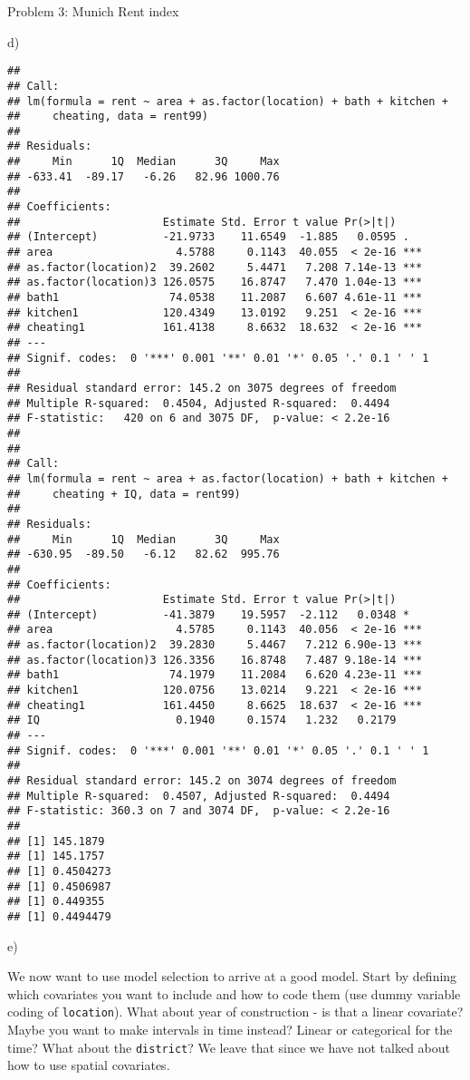 \documentclass[ignorenonframetext,]{beamer}
\begin{document}
\begin{frame}[fragile]
\begin{block}{Problem 3: Munich Rent index}
\begin{block}{d)}
\begin{verbatim}
## 
## Call:
## lm(formula = rent ~ area + as.factor(location) + bath + kitchen + 
##     cheating, data = rent99)
## 
## Residuals:
##     Min      1Q  Median      3Q     Max 
## -633.41  -89.17   -6.26   82.96 1000.76 
## 
## Coefficients:
##                      Estimate Std. Error t value Pr(>|t|)    
## (Intercept)          -21.9733    11.6549  -1.885   0.0595 .  
## area                   4.5788     0.1143  40.055  < 2e-16 ***
## as.factor(location)2  39.2602     5.4471   7.208 7.14e-13 ***
## as.factor(location)3 126.0575    16.8747   7.470 1.04e-13 ***
## bath1                 74.0538    11.2087   6.607 4.61e-11 ***
## kitchen1             120.4349    13.0192   9.251  < 2e-16 ***
## cheating1            161.4138     8.6632  18.632  < 2e-16 ***
## ---
## Signif. codes:  0 '***' 0.001 '**' 0.01 '*' 0.05 '.' 0.1 ' ' 1
## 
## Residual standard error: 145.2 on 3075 degrees of freedom
## Multiple R-squared:  0.4504, Adjusted R-squared:  0.4494 
## F-statistic:   420 on 6 and 3075 DF,  p-value: < 2.2e-16
## 
## 
## Call:
## lm(formula = rent ~ area + as.factor(location) + bath + kitchen + 
##     cheating + IQ, data = rent99)
## 
## Residuals:
##     Min      1Q  Median      3Q     Max 
## -630.95  -89.50   -6.12   82.62  995.76 
## 
## Coefficients:
##                      Estimate Std. Error t value Pr(>|t|)    
## (Intercept)          -41.3879    19.5957  -2.112   0.0348 *  
## area                   4.5785     0.1143  40.056  < 2e-16 ***
## as.factor(location)2  39.2830     5.4467   7.212 6.90e-13 ***
## as.factor(location)3 126.3356    16.8748   7.487 9.18e-14 ***
## bath1                 74.1979    11.2084   6.620 4.23e-11 ***
## kitchen1             120.0756    13.0214   9.221  < 2e-16 ***
## cheating1            161.4450     8.6625  18.637  < 2e-16 ***
## IQ                     0.1940     0.1574   1.232   0.2179    
## ---
## Signif. codes:  0 '***' 0.001 '**' 0.01 '*' 0.05 '.' 0.1 ' ' 1
## 
## Residual standard error: 145.2 on 3074 degrees of freedom
## Multiple R-squared:  0.4507, Adjusted R-squared:  0.4494 
## F-statistic: 360.3 on 7 and 3074 DF,  p-value: < 2.2e-16
## 
## [1] 145.1879
## [1] 145.1757
## [1] 0.4504273
## [1] 0.4506987
## [1] 0.449355
## [1] 0.4494479
\end{verbatim}

\end{block}

\begin{block}{e)}

We now want to use model selection to arrive at a good model. Start by
defining which covariates you want to include and how to code them (use
dummy variable coding of \texttt{location}). What about year of
construction - is that a linear covariate? Maybe you want to make
intervals in time instead? Linear or categorical for the time? What
about the \texttt{district}? We leave that since we have not talked
about how to use spatial covariates.


\end{block}
\end{block}
\end{frame}
\end{document}
